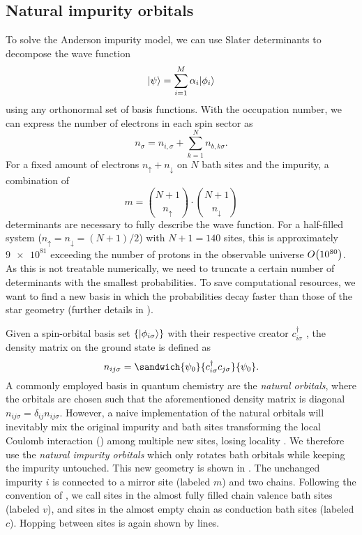 \subsection{Natural impurity orbitals}
\label{sec:natural-impurity-orbitals}

To solve the Anderson impurity model,
we can use Slater determinants to decompose the wave function
\begin{equation}
    \lvert\psi\rangle = \sum_{i=1}^M \alpha_i \lvert\phi_i\rangle
\end{equation}
using any orthonormal set of basis functions.
With the occupation number,
we can express the number of electrons in each spin sector as
\begin{equation}
    n_\sigma = n_{i,\sigma} + \sum_{k=1}^N n_{b,k\sigma}.
\end{equation}
For a fixed amount of electrons $n_\uparrow + n_\downarrow$ on $N$ bath sites and the impurity,
a combination of
\begin{equation}
    m = \binom{N+1}{n_\uparrow} \cdot \binom{N+1}{n_\downarrow}
\end{equation}
determinants are necessary to fully describe the wave function.
For a half-filled system ($n_\uparrow = n_\downarrow = (N+1)/2$)
with $N+1=140$ sites, this is approximately $\num{9e81}$
exceeding the number of protons in the observable universe $O\!\left(\num{e80}\right)$. %
As this is not treatable numerically,
we need to truncate a certain number of determinants with the smallest probabilities.
To save computational resources,
we want to find a new basis in which the probabilities decay faster than those of the star geometry
(further details in \cite{Bi2019}).

Given a spin-orbital basis set $\{\lvert\phi_{i\sigma}\rangle\}$
with their respective creator $c_{i\sigma}^\dag$ \cite{Bi2019},
the density matrix on the ground state is defined as
\begin{equation}
    n_{ij\sigma} = \sandwich{\psi_0}{c_{i\sigma}^\dag c_{j\sigma}}{\psi_0}.
\end{equation}
A commonly employed basis in quantum chemistry are the \emph{natural orbitals},
where the orbitals are chosen such that
the aforementioned density matrix is diagonal $n_{ij\sigma} = \delta_{ij}n_{ij\sigma}$.
However,
a naive implementation of the natural orbitals will inevitably mix the original impurity
and bath sites transforming the local Coulomb interaction ()
among multiple new sites,
losing locality \cite{Lu2014,Lu2019}.
We therefore use the \emph{natural impurity orbitals}
which only rotates bath orbitals while keeping the impurity untouched.
This new geometry is shown in .
The unchanged impurity $i$ is connected to a mirror site (labeled $m$) and two chains.
Following the convention of \cite{Lu2014,Lu2019},
we call sites in the almost fully filled chain valence bath sites (labeled $v$),
and sites in the almost empty chain as conduction bath sites (labeled $c$).
Hopping between sites is again shown by lines.

